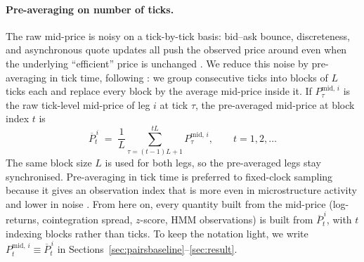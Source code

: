 \paragraph{Pre-averaging on number of ticks.}\label{sec:preaveraging}
The raw mid-price is noisy on a tick-by-tick basis: bid--ask bounce, discreteness, and asynchronous quote updates all push the observed price around even when the underlying ``efficient'' price is unchanged \parencite{hasbrouck2007microstructure}. We reduce this noise by pre-averaging in tick time, following \textcite{jacod2017}: we group consecutive ticks into blocks of $L$ ticks each and replace every block by the average mid-price inside it. If $P_{\tau}^{\mathrm{mid},\,i}$ is the raw tick-level mid-price of leg $i$ at tick $\tau$, the pre-averaged mid-price at block index $t$ is
\begin{equation}\label{eq:preaverage}
    \overline{P}_t^{\,i} \;=\; \frac{1}{L}\sum_{\tau=(t-1)L+1}^{tL} P_{\tau}^{\mathrm{mid},\,i},
    \qquad t = 1, 2, \ldots
\end{equation}
The same block size $L$ is used for both legs, so the pre-averaged legs stay synchronised. Pre-averaging in tick time is preferred to fixed-clock sampling because it gives an observation index that is more even in microstructure activity and lower in noise \parencite{jacod2017}. From here on, every quantity built from the mid-price (log-returns, cointegration spread, $z$-score, HMM observations) is built from $\overline{P}_t^{\,i}$, with $t$ indexing blocks rather than ticks. To keep the notation light, we write $P_t^{\mathrm{mid},\,i} \equiv \overline{P}_t^{\,i}$ in Sections~\ref{sec:pairsbaseline}--\ref{sec:result}.

